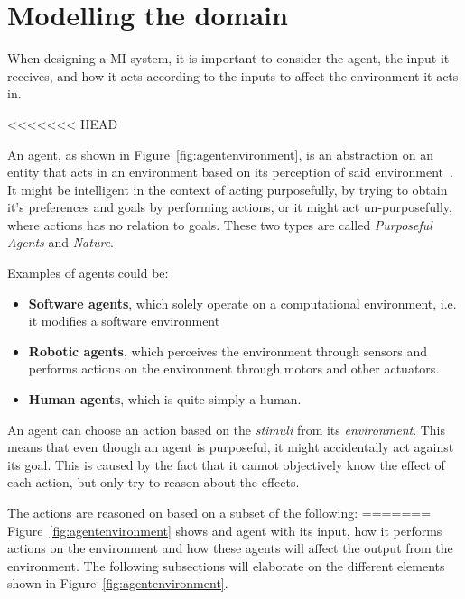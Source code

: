 \section{Modelling the domain}\label{Theory:MIModelling}
When designing a MI system, it is important to consider the agent, the input it receives, and how it acts according to the inputs to affect the environment it acts in.


<<<<<<< HEAD

An agent, as shown in Figure~\ref{fig:agentenvironment}, is an abstraction on an entity that acts in an environment based on its perception of said environment~\cite{ArtificialIntelligencealanpoole}.
It might be intelligent in the context of acting purposefully, by trying to obtain it's preferences and goals by performing actions, or it might act un-purposefully, where actions has no relation to goals.
These two types are called \textit{Purposeful Agents} and \textit{Nature}.

Examples of agents could be:
\begin{itemize}
	\item \textbf{Software agents}, which solely operate on a computational environment, i{.}e{.} it modifies a software environment
	\item \textbf{Robotic agents}, which perceives the environment through sensors and performs actions on the environment through motors and other actuators.
	\item \textbf{Human agents}, which is quite simply a human. 
\end{itemize}

An agent can choose an action based on the \textit{stimuli} from its \textit{environment}.
This means that even though an agent is purposeful, it might accidentally act against its goal.
This is caused by the fact that it cannot objectively know the effect of each action, but only try to reason about the effects.


The actions are reasoned on based on a subset of the following:
=======
Figure~\ref{fig:agentenvironment} shows and agent with its input, how it performs actions on the environment and how these agents will affect the output from the environment.
The following subsections will elaborate on the different elements shown in Figure~\ref{fig:agentenvironment}.
